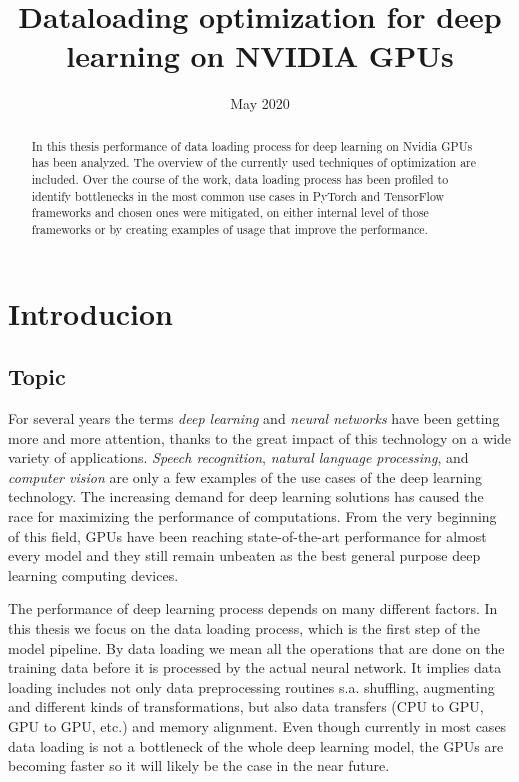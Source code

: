 \documentclass[licencjacka,en]{pracamgr}
\title{Dataloading optimization for deep learning on NVIDIA GPUs}
\date{May 2020}
\begin{document}
\maketitle

\begin{abstract}
In this thesis performance of data loading process for deep learning on Nvidia GPUs has been analyzed. The overview of the currently used techniques of optimization are included. Over the course of the work, data loading process has been profiled to identify bottlenecks in the most common use cases in PyTorch and TensorFlow frameworks and chosen ones were mitigated, on either internal level of those frameworks or by creating examples of usage that improve the performance.
\end{abstract}

\tableofcontents

\chapter*{Introducion}

\section*{Topic}

For several years the terms \emph{deep learning} and \emph{neural networks} have been getting more and more attention, thanks to the great impact of this technology on a wide variety of applications. \emph{Speech recognition}, \emph{natural language processing}, and \emph{computer vision} are only a few examples of the use cases of the deep learning technology. The increasing demand for deep learning solutions has caused the race for maximizing the performance of computations. From the very beginning of this field, GPUs have been reaching state-of-the-art performance for almost every model and they still remain unbeaten as the best general purpose deep learning computing devices.

The performance of deep learning process depends on many different factors. In this thesis we focus on the data loading process, which is the first step of the model pipeline. By data loading we mean all the operations that are done on the training data before it is processed by the actual neural network. It implies data loading includes not only data preprocessing routines s.a. shuffling, augmenting and different kinds of transformations, but also data transfers (CPU to GPU, GPU to GPU, etc.) and memory alignment. Even though currently in most cases data loading is not a bottleneck of the whole deep learning model, the GPUs are becoming faster so it will likely be the case in the near future.
\end{document}
